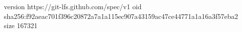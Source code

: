 version https://git-lfs.github.com/spec/v1
oid sha256:f92aeac701f396c20872a7a1a115ec907a43159ac47ce44771a1a16a3f57eba2
size 167321
